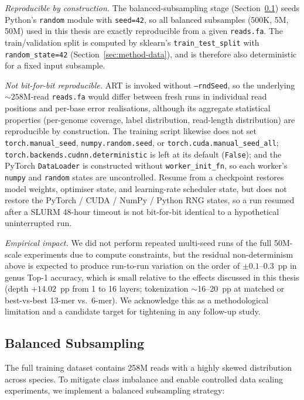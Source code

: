 \emph{Reproducible by construction.}
The balanced-subsampling stage (Section~\ref{sec:method-subsampling}) seeds Python's \texttt{random} module with \texttt{seed=42}, so all balanced subsamples (500K, 5M, 50M) used in this thesis are exactly reproducible from a given \texttt{reads.fa}.
The train/validation split is computed by sklearn's \texttt{train\_test\_split} with \texttt{random\_state=42} (Section~\ref{sec:method-data}), and is therefore also deterministic for a fixed input subsample.

\emph{Not bit-for-bit reproducible.}
ART is invoked without \texttt{--rndSeed}, so the underlying $\sim\!258$M-read \texttt{reads.fa} would differ between fresh runs in individual read positions and per-base error realisations, although its aggregate statistical properties (per-genome coverage, label distribution, read-length distribution) are reproducible by construction.
The training script likewise does not set \texttt{torch.manual\_seed}, \texttt{numpy.random.seed}, or \texttt{torch.cuda.manual\_seed\_all}; \texttt{torch.backends.cudnn.deterministic} is left at its default (\texttt{False}); and the PyTorch \texttt{DataLoader} is constructed without \texttt{worker\_init\_fn}, so each worker's \texttt{numpy} and \texttt{random} states are uncontrolled.
Resume from a checkpoint restores model weights, optimiser state, and learning-rate scheduler state, but does not restore the PyTorch / CUDA / NumPy / Python RNG states, so a run resumed after a SLURM 48-hour timeout is not bit-for-bit identical to a hypothetical uninterrupted run.

\emph{Empirical impact.}
We did not perform repeated multi-seed runs of the full 50M-scale experiments due to compute constraints, but the residual non-determinism above is expected to produce run-to-run variation on the order of $\pm 0.1$--$0.3$~pp in genus Top-1 accuracy, which is small relative to the effects discussed in this thesis (depth $+14.02$~pp from 1 to 16 layers; tokenization $\sim$16--20~pp at matched or best-vs-best 13-mer vs.\ 6-mer).
We acknowledge this as a methodological limitation and a candidate target for tightening in any follow-up study.

\subsection{Balanced Subsampling}
\label{sec:method-subsampling}

The full training dataset contains 258M reads with a highly skewed distribution across species. To mitigate class imbalance and enable controlled data scaling experiments, we implement a balanced subsampling strategy:

